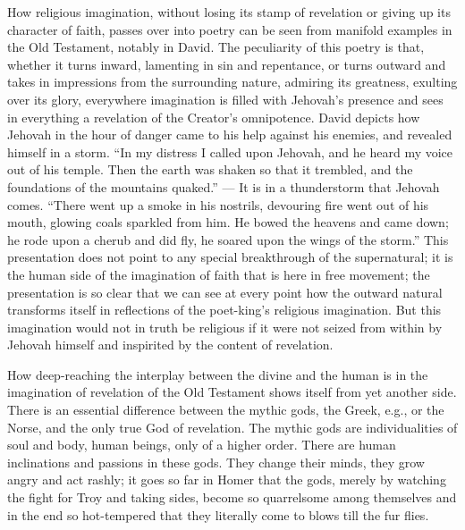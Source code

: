 \documentclass[12pt,a4paper,openany]{book}
\newcommand{\opage}[1]{\marginnote{\footnotesize\textit{[#1]}}}
\begin{document}
How religious imagination, without losing its stamp of revelation or giving up its character of faith, passes over into poetry can be seen from manifold examples in the Old Testament, notably in David. The peculiarity of this poetry is that, whether it turns inward, lamenting in sin and repentance, or turns outward and takes in impressions from the surrounding nature, admiring its greatness, exulting over its glory, everywhere imagination is filled with Jehovah's presence and sees in everything a revelation of the Creator's omnipotence. David depicts how Jehovah in the hour of danger came to his help against his enemies, and revealed himself in a storm. ``In my distress I called upon Jehovah, and he heard my voice out of his temple. Then the earth was shaken so that it trembled, and the foundations of the mountains quaked.'' --- It is in a thunderstorm that Jehovah comes. ``There went up a smoke in his nostrils, devouring fire went out of his mouth, glowing coals sparkled from him. He bowed the heavens and came down; he rode upon a cherub and did fly, he soared upon the wings of the storm.'' This presentation does not point to any special breakthrough of the supernatural; it is the human side of the imagination of faith that is here in free movement; the presentation is so clear that we can see at every point how the outward natural transforms
\setcounter{footnote}{0}%
\opage{53}itself in reflections of the poet-king's religious imagination. But this imagination would not in truth be religious if it were not seized from within by Jehovah himself and inspirited by the content of revelation.

How deep-reaching the interplay between the divine and the human is in the imagination of revelation of the Old Testament shows itself from yet another side. There is an essential difference between the mythic gods, the Greek, e.g., or the Norse, and the only true God of revelation. The mythic gods are individualities of soul and body, human beings, only of a higher order. There are human inclinations and passions in these gods. They change their minds, they grow angry and act rashly; it goes so far in Homer that the gods, merely by watching the fight for Troy and taking sides, become so quarrelsome among themselves and in the end so hot-tempered that they literally come to blows till the fur flies.
\end{document}
